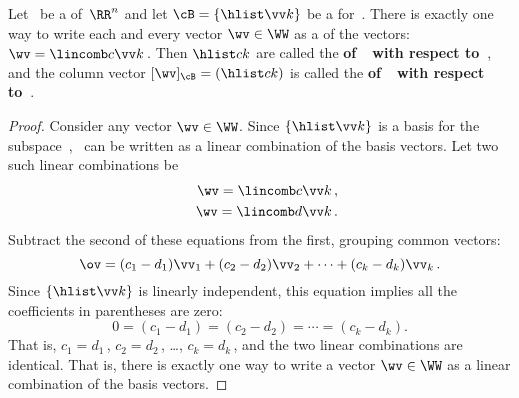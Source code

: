 \begin{theorem} \label{thm:ssbc} 
Let \WW\ be a  of~\(\RR^n\)  and let \(\cB=\{\hlist\vv k\}\) be a  for~\WW.  
There is exactly one way to write each and every vector \(\wv\in\WW\) as a  of the  vectors: \(\wv=\lincomb c\vv k\)\,.
Then \(\hlist ck\) are called the \textbf{ of~\wv\ with respect to~\cB}, and the column vector \([\wv]_{\cB}=(\hlist ck)\) is called the \textbf{ of~\wv\ with respect to~\cB}.
\end{theorem}
\begin{proof}  
Consider any vector \(\wv\in\WW\).
Since \(\{\hlist\vv k\}\) is a basis for the subspace~\WW, \wv~can be written as a linear combination of the basis vectors. 
Let two such linear combinations be
\begin{eqnarray*}&&
\wv=\lincomb c\vv k\,,
\\&&
\wv=\lincomb d\vv k\,.
\end{eqnarray*}
Subtract the second of these equations from the first, grouping common vectors:
\begin{equation*}
\ov=(c_1-d_1)\vv_1+(c_2-d_2)\vv_2+\cdots+(c_k-d_k)\vv_k\,.
\end{equation*}
Since \(\{\hlist\vv k\}\) is linearly independent, this equation implies all the coefficients in parentheses are zero:
\begin{equation*}
0=(c_1-d_1)=(c_2-d_2)=\cdots=(c_k-d_k).
\end{equation*}
That is, \(c_1=d_1\)\,, \(c_2=d_2\)\,, \ldots, \(c_k=d_k\)\,, and the two linear combinations are identical.
That is, there is exactly one way to write a vector \(\wv\in\WW\) as a {linear combination} of the {basis} vectors.
\end{proof}


